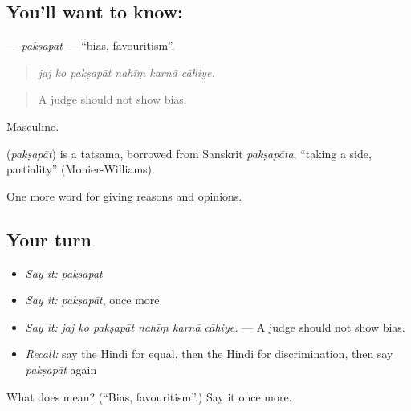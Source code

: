 \subsection*{You'll want to know: }
\textbf{} — \emph{pakṣapāt} — \textquotedblleft{}bias, favouritism\textquotedblright{}.

\begin{quote}
     
\end{quote}

\begin{quote}
\emph{jaj ko pakṣapāt nahīṃ karnā cāhiye.}
\end{quote}

\begin{quote}
A judge should not show bias.
\end{quote}

Masculine.

\begin{cousinweb}
\textbf{} (\emph{pakṣapāt}) is a tatsama, borrowed from Sanskrit \emph{pakṣapāta}, \textquotedblleft{}taking a side, partiality\textquotedblright{} (Monier-Williams).
\end{cousinweb}

\begin{grammarlens}[title={What you've built}]
One more word for giving reasons and opinions.
\end{grammarlens}

\subsection*{Your turn}
\begin{itemize}
\raggedright
  \item \emph{Say it:} \emph{pakṣapāt}
  \item \emph{Say it:} \emph{pakṣapāt}, once more
  \item \emph{Say it:} \emph{jaj ko pakṣapāt nahīṃ karnā cāhiye.} — A judge should not show bias.
  \item \emph{Recall:} say the Hindi for equal, then the Hindi for discrimination, then say \emph{pakṣapāt} again
\end{itemize}

\begin{tcolorbox}[breakable,colback=teal!4,colframe=teal!35!black,title={Before you move on}]
What does  mean? (\textquotedblleft{}Bias, favouritism\textquotedblright{}.) Say it once more.
\end{tcolorbox}
